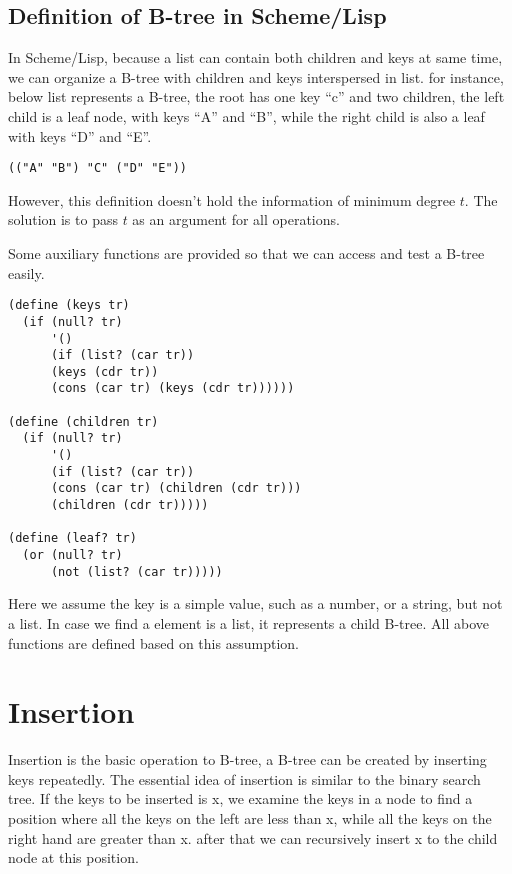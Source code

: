 \documentclass{article}
\begin{document}
\subsection*{Definition of B-tree in Scheme/Lisp}
In Scheme/Lisp, because a list can contain both children and keys at
same time, we can organize a B-tree with children and keys interspersed
in list. for instance, below list represents a B-tree, the root has one
key ``c'' and two children, the left child is a leaf node, with keys ``A''
and ``B'', while the right child is also a leaf with keys ``D'' and ``E''.

\lstset{language=lisp}
\begin{lstlisting}
(("A" "B") "C" ("D" "E"))
\end{lstlisting}

However, this definition doesn't hold the information of minimum degree $t$.
The solution is to pass $t$ as an argument for all operations.

Some auxiliary functions are provided so that we can access and test a 
B-tree easily.

\begin{lstlisting}
(define (keys tr)
  (if (null? tr) 
      '()
      (if (list? (car tr))
	  (keys (cdr tr))
	  (cons (car tr) (keys (cdr tr))))))

(define (children tr)
  (if (null? tr)
      '()
      (if (list? (car tr))
	  (cons (car tr) (children (cdr tr)))
	  (children (cdr tr)))))

(define (leaf? tr)
  (or (null? tr)
      (not (list? (car tr)))))
\end{lstlisting}

Here we assume the key is a simple value, such as a number, or a string, 
but not a list. In case we find a element is a list, it represents a
child B-tree. All above functions are defined based on this assumption. 

\section{Insertion}
\label{btree-insertion}
Insertion is the basic operation to B-tree, a B-tree can be created by inserting
keys repeatedly. The essential idea of insertion is similar to the binary
search tree. If the keys to be inserted is x, we examine the keys in a 
node to find a position where all the keys on the left are less than x,
while all the keys on the right hand are greater than x. after that
we can recursively insert x to the child node at this position.
\end{document}
